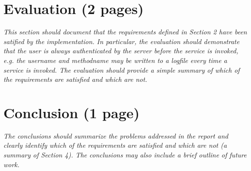\documentclass[12pt]{article}
\begin{document}
\newpage

\section{Evaluation (2 pages)}
\label{sec:Evaluation}

\textit{This section should document that the requirements defined in Section 2 have been satified by the implementation. In particular, the evaluation should demonstrate that the user is always authenticated by the server before the service is invoked, e.g. the username and methodname may be written to a logfile every time a service is invoked.
The evaluation should provide a simple summary of which of the requirements are satisfied and which are not.}

\newpage

\section{Conclusion (1 page)}
\label{sec:Conclusion}

\textit{The conclusions should summarize the problems addressed in the report and clearly identify which of the requirements are satisfied and which are not (a summary of Section 4). The conclusions may also include a brief outline of future work.}




%
\end{document}
